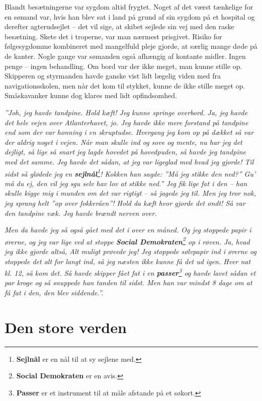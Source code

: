 Blandt besætningerne var sygdom altid frygtet. Noget af det værst
tænkelige for en sømand var, hvis han blev sat i land på grund af sin
sygdom på et hospital og derefter agterudsejlet -- det vil sige, at
skibet sejlede sin vej med den raske besætning. Skete det i troperne,
var man nærmest prisgivet. Risiko for følgesygdomme kombineret med
mangelfuld pleje gjorde, at særlig mange døde på de kanter. Nogle gange
var sømanden også afhængig af kontante midler. Ingen penge -- ingen
behandling. Om bord var der ikke meget, man kunne stille op. Skipperen
og styrmanden havde ganske vist lidt lægelig viden med fra
navigationsskolen, men når det kom til stykket, kunne de ikke stille
meget op. Småskavanker kunne dog klares med lidt opfindsomhed.

\emph{''Joh, jeg havde tandpine. Hold kæft! Jeg kunne springe overbord.
Ja, jeg havde det hele vejen over Atlanterhavet, jo. Jeg havde ikke mere
forstand på tandpine end som der var honning i en skruptudse. Hvergang
jeg kom op på dækket så var der aldrig noget i vejen. Når man skulle ind
og sove og mente, nu har jeg det dejligt, så lige så snart jeg lagde
hovedet på hovedpuden, så havde jeg tandpine med det samme. Jeg havde
det sådan, at jeg var ligeglad med hvad jeg gjorde! Til sidst så glødede
jeg en \textbf{sejlnål}\footnote{\textbf{Sejlnål} er en nål til at sy
  sejlene med.}! Kokken han sagde: ''Må jeg stikke den ned?'' Gu' må du
ej, den vil jeg sgu selv hav lov at stikke ned.'' Jeg fik lige fat i den
-- han skulle kigge mig i munden om det var rigtigt -- så jagede jeg
til. Men jeg tror nok, jeg sprang helt ''op over fokkeråen''! Hold da
kæft hvor gjorde det ondt! Så var den tandpine væk. Jeg havde brændt
nerven over.}

\emph{Men da havde jeg så også gået med det i over en måned. Og jeg
stoppede papir i ørerne, og jeg var lige ved at stoppe \textbf{Social
Demokraten}\footnote{\textbf{Social Demokraten} er en avis.} op i
r\o ven. Ja, hvad jeg ikke gjorde altså, Alt muligt prøvede jeg! Jeg
stoppede sølvpapir ind i ørerne og stoppede det alt for langt ind, så
jeg næsten ikke kunne få det ud igen. Hver nat kl. 12, så kom det. Så
havde skipper fået fat i en \textbf{passer}\footnote{\textbf{Passer} er
  et instrument til at måle afstande på et søkort.} og havde lavet sådan
et par kroge og så snuppede han tanden til sidst. Men han var mindst 8
dage om at få fat i den, den blev siddende.''.}

\chapter{Den store verden}

